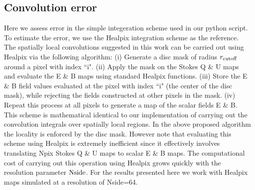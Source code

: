 \subsection{Convolution error}\label{sec:convolution_err}
Here we assess  error in the simple integeration scheme used in our python script. To estimate the error, we use the Healpix integration scheme as the reference. The spatially local convolutions suggested in this work can be carried out using Healpix via the following algorithm: (i) Generate a disc mask of radius $r_{\rm cutoff}$ around a pixel with index ``i". (ii) Apply the mask on the Stokes Q \& U maps and evaluate the E \& B maps using standard Healpix functions. (iii) Store the E \& B field values evaluated at the pixel with index ``i" (the center of the disc mask), while rejecting the fields constructed at other pixels in the mask. (iv) Repeat this process at all pixels to generate a map of the scalar fields E \&  B.  This scheme is mathematical identical to our implementation of carrying out the convolution integrals over spatially local regions. In the above proposed algorithm the locality is enforced by the disc mask. However note that evaluating this scheme using Healpix is extremely inefficient since it effectively involves translating Npix Stokes Q \& U maps to scalar E \& B maps. The computational cost of carrying out this operation using Healpix grows quickly with the resolution parameter $\rm Nside$. For the results presented here we work with Healpix maps simulated at a resolution of Nside=64. 

